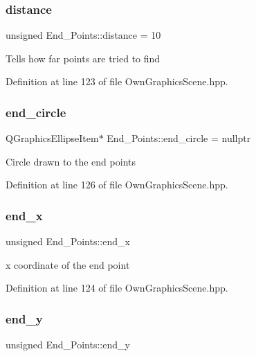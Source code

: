 \subsubsection{\texorpdfstring{distance}{distance}}
{\footnotesize\ttfamily unsigned End\+\_\+\+Points\+::distance = 10}

Tells how far points are tried to find 

Definition at line 123 of file Own\+Graphics\+Scene.\+hpp.

\mbox{\label{structEnd__Points_abf301947140c1584823b50071c7b8ee6}} 
\subsubsection{\texorpdfstring{end\+\_\+circle}{end\_circle}}
{\footnotesize\ttfamily Q\+Graphics\+Ellipse\+Item$\ast$ End\+\_\+\+Points\+::end\+\_\+circle = nullptr}

Circle drawn to the end points 

Definition at line 126 of file Own\+Graphics\+Scene.\+hpp.

\mbox{\label{structEnd__Points_a2b33a99792ec437e7c2369ceaf435176}} 
\subsubsection{\texorpdfstring{end\+\_\+x}{end\_x}}
{\footnotesize\ttfamily unsigned End\+\_\+\+Points\+::end\+\_\+x}

x coordinate of the end point 

Definition at line 124 of file Own\+Graphics\+Scene.\+hpp.

\mbox{\label{structEnd__Points_a04207ee9a97ee6d785b493305cd9e7e8}} 
\subsubsection{\texorpdfstring{end\+\_\+y}{end\_y}}
{\footnotesize\ttfamily unsigned End\+\_\+\+Points\+::end\+\_\+y}

